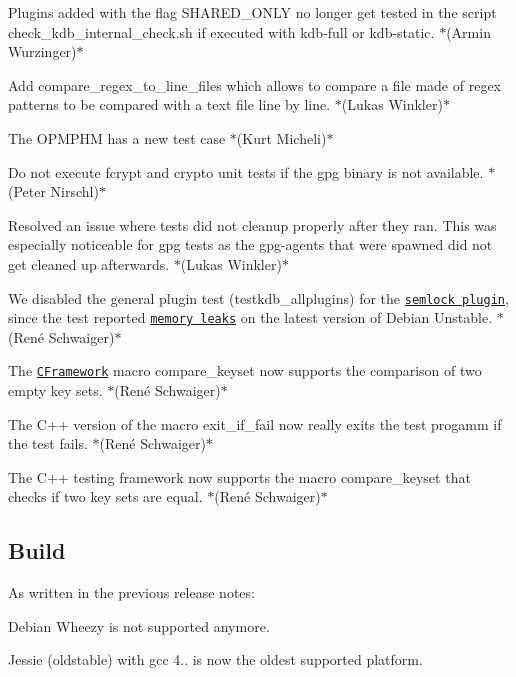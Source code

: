 \begin{DoxyItemize}
\item Plugins added with the flag {\ttfamily S\+H\+A\+R\+E\+D\+\_\+\+O\+N\+LY} no longer get tested in the script {\ttfamily check\+\_\+kdb\+\_\+internal\+\_\+check.\+sh} if executed with kdb-\/full or kdb-\/static. $\ast$(Armin Wurzinger)$\ast$
\item Add {\ttfamily compare\+\_\+regex\+\_\+to\+\_\+line\+\_\+files} which allows to compare a file made of regex patterns to be compared with a text file line by line. $\ast$(Lukas Winkler)$\ast$
\item The O\+P\+M\+P\+HM has a new test case $\ast$(Kurt Micheli)$\ast$
\item Do not execute {\ttfamily fcrypt} and {\ttfamily crypto} unit tests if the {\ttfamily gpg} binary is not available. $\ast$(Peter Nirschl)$\ast$
\item Resolved an issue where tests did not cleanup properly after they ran. This was especially noticeable for {\ttfamily gpg} tests as the {\ttfamily gpg-\/agents} that were spawned did not get cleaned up afterwards. $\ast$(Lukas Winkler)$\ast$
\item We disabled the general plugin test ({\ttfamily testkdb\+\_\+allplugins}) for the \href{https://libelektra.org/plugins/mini}{\tt {\ttfamily semlock} plugin}, since the test reported \href{https://issues.libelektra.org/2113}{\tt memory leaks} on the latest version of Debian Unstable. $\ast$(René Schwaiger)$\ast$
\item The \href{https://master.libelektra.org/tests/cframework}{\tt C\+Framework} macro {\ttfamily compare\+\_\+keyset} now supports the comparison of two empty key sets. $\ast$(René Schwaiger)$\ast$
\item The C++ version of the macro {\ttfamily exit\+\_\+if\+\_\+fail} now really exits the test progamm if the test fails. $\ast$(René Schwaiger)$\ast$
\item The C++ testing framework now supports the macro {\ttfamily compare\+\_\+keyset} that checks if two key sets are equal. $\ast$(René Schwaiger)$\ast$
\end{DoxyItemize}

\subsection*{Build}

As written in the previous release notes\+:


\begin{DoxyItemize}
\item Debian Wheezy is not supported anymore.
\item Jessie (oldstable) with gcc 4.. is now the oldest supported platform.
\end{DoxyItemize}

